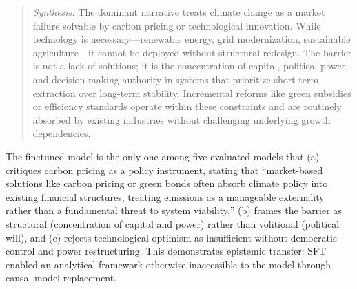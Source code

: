 \documentclass[sigconf]{acmart}
\begin{document}
\begin{quote}
\textit{Synthesis.} The dominant narrative treats climate change as a market failure solvable by carbon pricing or technological innovation. While technology is necessary---renewable energy, grid modernization, sustainable agriculture---it cannot be deployed without structural redesign. The barrier is not a lack of solutions; it is the concentration of capital, political power, and decision-making authority in systems that prioritize short-term extraction over long-term stability. Incremental reforms like green subsidies or efficiency standards operate within these constraints and are routinely absorbed by existing industries without challenging underlying growth dependencies.
\end{quote}

The finetuned model is the only one among five evaluated models that (a) critiques carbon pricing as a policy instrument, stating that ``market-based solutions like carbon pricing or green bonds often absorb climate policy into existing financial structures, treating emissions as a manageable externality rather than a fundamental threat to system viability,'' (b) frames the barrier as structural (concentration of capital and power) rather than volitional (political will), and (c) rejects technological optimism as insufficient without democratic control and power restructuring. This demonstrates epistemic transfer: SFT enabled an analytical framework otherwise inaccessible to the model through causal model replacement.
\end{document}
